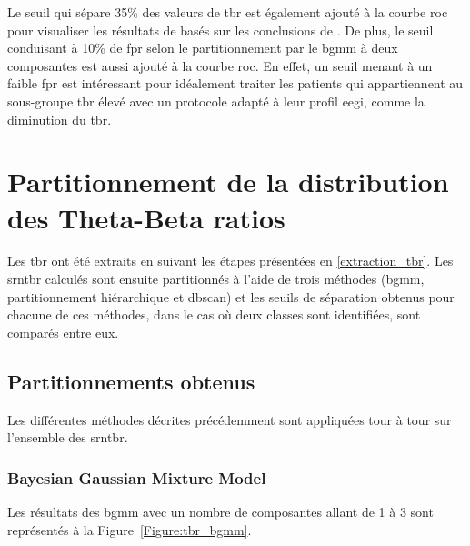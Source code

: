 Le seuil qui sépare 35\% des valeurs de 
\gls{tbr} est également ajouté à la courbe \gls{roc} pour visualiser les résultats de \citet{Zhang2017} basés sur les conclusions de \citet{Clarke2011}.
De plus, le seuil conduisant à 10\% de \gls{fpr} selon le partitionnement par le \gls{bgmm} à deux composantes est aussi ajouté à la courbe \gls{roc}. 
En effet, un seuil menant à un faible \gls{fpr} est intéressant pour idéalement traiter les patients qui appartiennent au sous-groupe \gls{tbr} élevé avec 
un protocole adapté à leur profil \gls{eegi}, comme la diminution du \gls{tbr}.

\section{Partitionnement de la distribution des Theta-Beta ratios}

Les \gls{tbr} ont été extraits en suivant les étapes présentées en \ref{extraction_tbr}. Les \gls{srntbr} calculés sont ensuite partitionnés à l'aide de trois
méthodes (\gls{bgmm}, partitionnement hiérarchique et \gls{dbscan}) et les seuils de séparation obtenus pour chacune de ces méthodes, dans le cas où deux classes sont 
identifiées, sont comparés entre eux.  

\subsection{Partitionnements obtenus}

Les différentes méthodes décrites précédemment sont appliquées tour à tour sur l'ensemble des \gls{srntbr}.

\subsubsection{Bayesian Gaussian Mixture Model}

Les résultats des \gls{bgmm} avec un nombre de composantes allant de 1 à 3 sont représentés à la Figure~\ref{Figure:tbr_bgmm}. 


